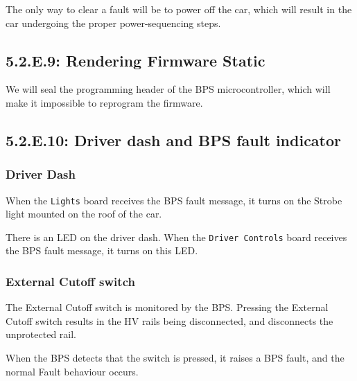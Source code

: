 \documentclass[10pt]{article}
\begin{document}
The only way to clear a fault will be to power off the car, which will result
in the car undergoing the proper power-sequencing steps.

\subsection{5.2.E.9: Rendering Firmware Static}

We will seal the programming header of the BPS microcontroller, which will
make it impossible to reprogram the firmware.

\subsection{5.2.E.10: Driver dash and BPS fault indicator}

\subsubsection{Driver Dash}
When the \texttt{Lights} board receives the BPS fault message, it turns on the
Strobe light mounted on the roof of the car.

There is an LED on the driver dash. When the \texttt{Driver Controls} board
receives the BPS fault message, it turns on this LED.

\subsubsection{External Cutoff switch}

The External Cutoff switch is monitored by the BPS. Pressing the External
Cutoff switch results in the HV rails being disconnected, and disconnects the
unprotected rail.

When the BPS detects that the switch is pressed, it raises a BPS fault, and
the normal Fault behaviour occurs.


\pagebreak
\appendix
\end{document}
